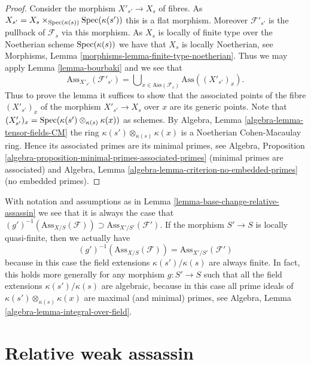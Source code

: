 \begin{proof}
Consider the morphism $X'_{s'} \to X_s$ of fibres. As
$X_{s'} = X_s \times_{\mathop{\mathrm{Spec}}(\kappa(s))} \mathop{\mathrm{Spec}}(\kappa(s'))$
this is a flat morphism. Moreover $\mathcal{F}'_{s'}$ is the pullback
of $\mathcal{F}_s$ via this morphism. As $X_s$ is locally of finite
type over the Noetherian scheme $\mathop{\mathrm{Spec}}(\kappa(s))$ we have that
$X_s$ is locally Noetherian, see
Morphisms, Lemma \ref{morphisms-lemma-finite-type-noetherian}.
Thus we may apply
Lemma \ref{lemma-bourbaki}
and we see that
$$
\text{Ass}_{X'_{s'}}(\mathcal{F}'_{s'}) =
\bigcup\nolimits_{x \in \text{Ass}(\mathcal{F}_s)} \text{Ass}((X'_{s'})_x).
$$
Thus to prove the lemma it suffices to show that the associated points
of the fibre $(X'_{s'})_x$ of the morphism $X'_{s'} \to X_s$ over $x$
are its generic points. Note that
$(X'_{s'})_x = \mathop{\mathrm{Spec}}(\kappa(s') \otimes_{\kappa(s)} \kappa(x))$
as schemes. By
Algebra, Lemma \ref{algebra-lemma-tensor-fields-CM}
the ring $\kappa(s') \otimes_{\kappa(s)} \kappa(x)$ is a Noetherian
Cohen-Macaulay ring. Hence its associated primes are its minimal primes, see
Algebra, Proposition \ref{algebra-proposition-minimal-primes-associated-primes}
(minimal primes are associated) and
Algebra, Lemma \ref{algebra-lemma-criterion-no-embedded-primes}
(no embedded primes).
\end{proof}

\begin{remark}
\label{remark-base-change-relative-assassin}
With notation and assumptions as in
Lemma \ref{lemma-base-change-relative-assassin}
we see that it is always the case that
$(g')^{-1}(\text{Ass}_{X/S}(\mathcal{F})) \supset
\text{Ass}_{X'/S'}(\mathcal{F}')$.
If the morphism $S' \to S$ is locally quasi-finite, then we actually have
$$
(g')^{-1}(\text{Ass}_{X/S}(\mathcal{F}))
=
\text{Ass}_{X'/S'}(\mathcal{F}')
$$
because in this case the field extensions $\kappa(s')/\kappa(s)$
are always finite. In fact, this holds more generally for any morphism
$g : S' \to S$ such that all the field extensions
$\kappa(s')/\kappa(s)$ are algebraic, because in this case all
prime ideals of $\kappa(s') \otimes_{\kappa(s)} \kappa(x)$ are
maximal (and minimal) primes, see
Algebra, Lemma \ref{algebra-lemma-integral-over-field}.
\end{remark}




\section{Relative weak assassin}
\label{section-relative-weak-assassin}

